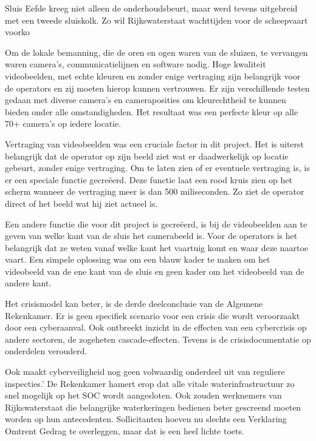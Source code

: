 \cite{kramerZeeland}
Sluis Eefde kreeg niet alleen de onderhoudsbeurt, maar werd tevens uitgebreid met een tweede sluiskolk. Zo wil Rijkswaterstaat wachttijden voor de scheepvaart voorko

\cite{gww29032021kantelendesluisdeur}
Om de lokale bemanning, die de oren en ogen waren van de sluizen, te vervangen waren camera’s, communicatielijnen en software nodig. Hoge kwaliteit videobeelden, met echte kleuren en zonder enige vertraging zijn belangrijk voor de operators en zij moeten hierop kunnen vertrouwen. Er zijn verschillende testen gedaan met diverse camera’s en cameraposities om kleurechtheid te kunnen bieden onder alle omstandigheden. Het resultaat was een perfecte kleur op alle 70+ camera’s op iedere locatie.

Vertraging van videobeelden was een cruciale factor in dit project. Het is uiterst belangrijk dat de operator op zijn beeld ziet wat er daadwerkelijk op locatie gebeurt, zonder enige vertraging. Om te laten zien of er eventuele vertraging is, is er een speciale functie gecreëerd. Deze functie laat een rood kruis zien op het scherm wanneer de vertraging meer is dan 500 miliseconden. Zo ziet de operator direct of het beeld wat hij ziet actueel is. 

Een andere functie die voor dit project is gecreëerd, is bij de videobeelden aan te geven van welke kant van de sluis het camerabeeld is. Voor de operators is het belangrijk dat ze weten vanaf welke kant het vaartuig komt en waar deze naartoe vaart. Een simpele oplossing was om een blauw kader te maken om het videobeeld van de ene kant van de sluis en geen kader om het videobeeld van de andere kant. 


\cite{thkwaterwerken}
Het crisismodel kan beter, is de derde deelconclusie van de Algemene Rekenkamer. Er is geen specifiek scenario voor een crisis die wordt veroorzaakt door een cyberaanval. Ook ontbreekt inzicht in de effecten van een cybercrisis op andere sectoren, de zogeheten cascade-effecten. Tevens is de crisisdocumentatie op onderdelen verouderd.

\cite{rekenkamercybersecWater}
Ook maakt cyberveiligheid nog geen volwaardig onderdeel uit van reguliere inspecties.’ De Rekenkamer hamert erop dat alle vitale waterinfrastructuur zo snel mogelijk op het SOC wordt aangesloten. Ook zouden werknemers van Rijkswaterstaat die belangrijke waterkeringen bedienen beter gescreend moeten worden op hun antecedenten. Sollicitanten hoeven nu slechts een Verklaring Omtrent Gedrag te overleggen, maar dat is een heel lichte toets.

